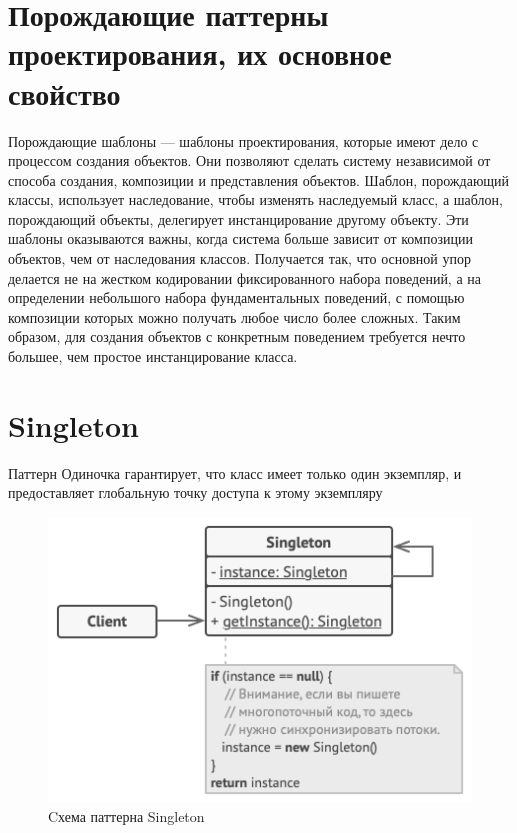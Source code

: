 \section{Порождающие паттерны проектирования, их основное свойство}
Порождающие шаблоны — шаблоны проектирования, которые имеют дело с процессом создания объектов. Они позволяют сделать систему независимой от способа создания, композиции и представления объектов. Шаблон, порождающий классы, использует наследование, чтобы изменять наследуемый класс, а шаблон, порождающий объекты, делегирует инстанцирование другому объекту.
Эти шаблоны оказываются важны, когда система больше зависит от композиции объектов, чем от наследования классов. Получается так, что основной упор делается не на жестком кодировании фиксированного набора поведений, а на определении небольшого набора фундаментальных поведений, с помощью композиции которых можно получать любое число более сложных. Таким образом, для создания объектов с конкретным поведением требуется нечто большее, чем простое инстанцирование класса. 

\section{Singleton}
Паттерн Одиночка гарантирует, что класс имеет только один экземпляр, и предоставляет глобальную точку доступа к этому экземпляру
\begin{figure}[!ht]
\begin{center}
\includegraphics[scale=0.7]{images/pic/pic26-1.png}\caption{Cхема паттерна Singleton}\label{figure1}
\end{center}
\end{figure}
\newpage
